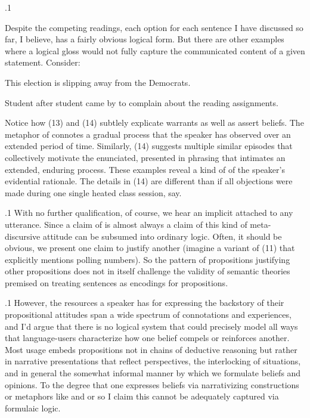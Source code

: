 \documentclass[11pt, twocolumn]{article}
\begin{document}
\p.1{%
\:\+Despite the competing readings, each option for each sentence I have discussed so
far, I believe, has a fairly obvious logical form. \> But there are other examples where a logical
gloss would not fully capture the communicated content of a given 
statement. \> Consider:\<

\begin{exsGroup}

\exsItem{}   This election is slipping away from the Democrats.

\exsItem{}   Student after student came by to complain about the reading assignments.

\end{exsGroup}

\nip{}%
\+Notice how \exsRef(13) and \exsRef(14) subtlely explicate warrants as well as assert beliefs. \> The metaphor of  connotes a
gradual process that the speaker has observed over an extended period of time. \> Similarly,
\exsRef(14) suggests multiple similar episodes that collectively motivate the enunciated,
presented in phrasing that intimates an extended,
enduring process. \> These examples reveal a kind of  of the speaker's evidential
rationale. \> The details in \exsRef(14) are different than if all objections were made during one
single heated class session, say.\<\;
} %

\p.1{%
\:\+With no further qualification, of course, we
hear an implicit  attached to any utterance. \> Since a
claim of  is almost always a claim of  this kind of
meta-discursive attitude can be subsumed into ordinary logic. \> Often, it should be obvious, we present one claim to justify another
(imagine a variant of \exsRef(11) that explicitly mentions polling 
numbers). \> So the pattern of propositions justifying other propositions
does not in itself challenge the validity of semantic theories
premised on treating sentences as encodings for propositions.\<\;
} %

\p.1{%
\:\+However, the resources a speaker has for expressing the backstory of their
propositional attitudes span a wide spectrum of connotations and experiences,
and I'd argue that there is no logical system that could precisely model
all ways that language-users characterize how one belief compels
or reinforces another. \> Most usage embeds propositions not in
chains of deductive reasoning but rather in narrative presentations
that reflect perspectives, the interlocking of situations, and
in general the somewhat informal manner by which
we formulate beliefs and opinions. \> To the degree that one
expresses beliefs via narrativizing constructions or metaphors like
 and  \mdash{} or so I claim \mdash{} this
 cannot be adequately captured via formulaic logic.\<\;
} %
\end{document}
